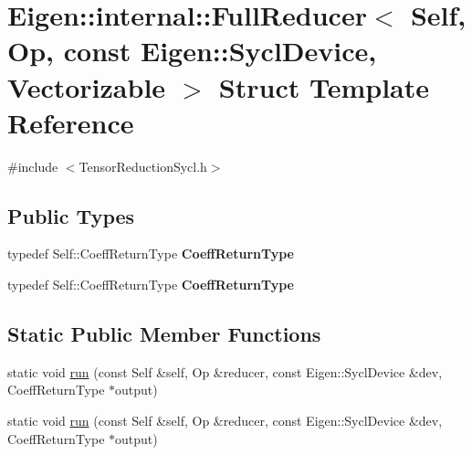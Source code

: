 \hypertarget{struct_eigen_1_1internal_1_1_full_reducer_3_01_self_00_01_op_00_01const_01_eigen_1_1_sycl_device_00_01_vectorizable_01_4}{}\section{Eigen\+:\+:internal\+:\+:Full\+Reducer$<$ Self, Op, const Eigen\+:\+:Sycl\+Device, Vectorizable $>$ Struct Template Reference}
\label{struct_eigen_1_1internal_1_1_full_reducer_3_01_self_00_01_op_00_01const_01_eigen_1_1_sycl_device_00_01_vectorizable_01_4}


{\ttfamily \#include $<$Tensor\+Reduction\+Sycl.\+h$>$}

\subsection*{Public Types}
\begin{DoxyCompactItemize}
\item 
\mbox{\label{struct_eigen_1_1internal_1_1_full_reducer_3_01_self_00_01_op_00_01const_01_eigen_1_1_sycl_device_00_01_vectorizable_01_4_aa02e68b933cb294854a8dd61a3952962}} 
typedef Self\+::\+Coeff\+Return\+Type {\bfseries Coeff\+Return\+Type}
\item 
\mbox{\label{struct_eigen_1_1internal_1_1_full_reducer_3_01_self_00_01_op_00_01const_01_eigen_1_1_sycl_device_00_01_vectorizable_01_4_aa02e68b933cb294854a8dd61a3952962}} 
typedef Self\+::\+Coeff\+Return\+Type {\bfseries Coeff\+Return\+Type}
\end{DoxyCompactItemize}
\subsection*{Static Public Member Functions}
\begin{DoxyCompactItemize}
\item 
static void \hyperlink{struct_eigen_1_1internal_1_1_full_reducer_3_01_self_00_01_op_00_01const_01_eigen_1_1_sycl_device_00_01_vectorizable_01_4_aee608a1f9a8dca2b99477c2738357c05}{run} (const Self \&self, Op \&reducer, const Eigen\+::\+Sycl\+Device \&dev, Coeff\+Return\+Type $\ast$output)
\item 
static void \hyperlink{struct_eigen_1_1internal_1_1_full_reducer_3_01_self_00_01_op_00_01const_01_eigen_1_1_sycl_device_00_01_vectorizable_01_4_aee608a1f9a8dca2b99477c2738357c05}{run} (const Self \&self, Op \&reducer, const Eigen\+::\+Sycl\+Device \&dev, Coeff\+Return\+Type $\ast$output)
\end{DoxyCompactItemize}

